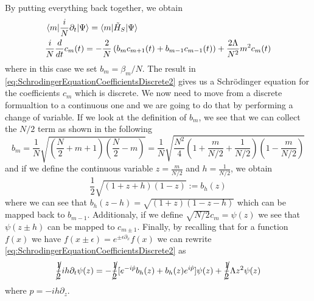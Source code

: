 By putting everything back together, we obtain
\begin{align}
	 & \braket{m|\frac{i}{N}\partial_t|\Psi} = \braket{m|\tilde{H}_{S}|\Psi}\label{eq:SchrodingerEquationCoefficientsDiscrete1}                                                               \\
	 & \frac{i}{N}\frac{d}{dt}c_{m}(t) =  -\frac{2}{N}\left( b_{m}c_{m+1}(t) + b_{m-1}c_{m-1}(t) \right) + \frac{2\Lambda}{N^2}m^2c_{m}(t)\label{eq:SchrodingerEquationCoefficientsDiscrete2}
\end{align}
where in this case we set $ b_{m} = \beta_m/N $.
The result in \cref{eq:SchrodingerEquationCoefficientsDiscrete2} gives us a Schr{\"o}dinger equation for the coefficients $ c_{m} $ which is discrete. We now need to move from a discrete formualtion to a continuous one and we are going to do that by performing a change of variable.
If we look at the definition of $ b_{m} $, we see that we can collect the $ N/2 $ term as shown in the following
\begin{equation}
	\label{eq:CoefficientCollectingN}
	b_m =\frac{1}{N}\sqrt{
		\left(\frac{N}{2} + m +1\right)  \left(\frac{N}{2} -m\right)
	}  =
	\frac{1}{N}\sqrt{
		\frac{N^2}{4}
		\left(1 + \frac{m}{N/2} +\frac{1}{N/2}\right)
		\left(1 -\frac{m}{N/2}\right)
	}
\end{equation}
and if we define the continuous variable $ z = \frac{m}{N/2} $  and $ h = \frac{1}{N/2} $, we obtain
\begin{equation}
	\label{eq:CoefficientContinuous}
	\frac{1}{2}
	\sqrt{
		\left(1 + z +h\right)
		\left(1 -z\right)
	}
	:=  b_{h}(z)
\end{equation}
where we can see that $ b_{h}(z-h) = \sqrt{ \left(1 + z \right)\left(1 -z -h\right) } $ which can be mapped back to $ b_{m-1} $.
Additionaly, if we define $ \sqrt{N/2}  c_{m}= \psi(z) $ we see that $ \psi(z \pm h) $ can be mapped to $ c_{m\pm 1} $.
Finally, by recalling that for a function $f(x)$ we have $ f(x \pm \epsilon) = e^{\pm \epsilon\partial_{x}}f(x) $ we can rewrite \cref{eq:SchrodingerEquationCoefficientsDiscrete2} as
\begin{equation} %
	\label{eq:SchrodingerEquationCoefficientsContinuous}
	\cancel{\frac{1}{2}}ih\partial_t\psi(z) =
	-\cancel{\frac{1}{2}}[ e^{-i\hat{p}} b_{h}(z) + b_{h}(z)e^{i\hat{p}} ]\psi(z) +
	\cancel{\frac{1}{2}}\Lambda z^2 \psi(z)
\end{equation}
where $ \hat{p} = -ih\partial_z $.
